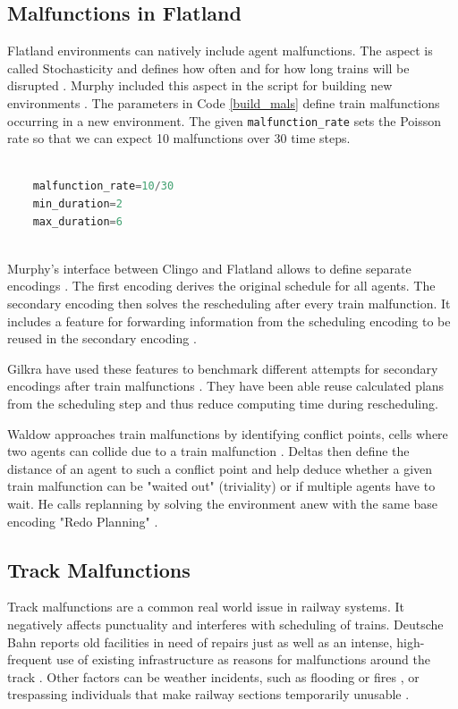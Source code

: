 \documentclass[runningheads]{llncs}
\begin{document}
\subsection{Malfunctions in Flatland}
\label{flatland_mals}
Flatland environments can natively include agent malfunctions. The aspect is called Stochasticity and defines how often and for how long trains will be disrupted \cite{Flatland2023}. Murphy included this aspect in the script for building new environments \cite{Murphy2026a}. The parameters in Code \ref{build_mals} define train malfunctions occurring in a new environment. The given \verb|malfunction_rate| sets the Poisson rate so that we can expect 10 malfunctions over 30 time steps.

\begin{lstlisting}[style=mystyle, language=Python, caption={Generate train malfunctions in build.py.}, label={build_mals}]
	
	malfunction_rate=10/30
	min_duration=2
	max_duration=6
	
\end{lstlisting}

Murphy's interface between Clingo and Flatland allows to define separate encodings \cite{Murphy2026a}. The first encoding derives the original schedule for all agents. The secondary encoding then solves the rescheduling after every train malfunction. It includes a feature for forwarding information from the scheduling encoding to be reused in the secondary encoding \cite{Murphy2026a} \cite{gilkra2025}. 

Gilkra have used these features to benchmark different attempts for secondary encodings after train malfunctions \cite{gilkra2025}. They have been able reuse calculated plans from the scheduling step and thus reduce computing time during rescheduling.

Waldow approaches train malfunctions by identifying conflict points, cells where two agents can collide due to a train malfunction \cite{waldow2025}. Deltas then define the distance of an agent to such a conflict point and help deduce whether a given train malfunction can be "waited out" (triviality) or if multiple agents have to wait. He calls replanning by solving the environment anew with the same base encoding "Redo Planning" \cite[p.~24]{waldow2025}.


\subsection{Track Malfunctions}
\label{trkmals}
Track malfunctions are a common real world issue in railway systems. It negatively affects punctuality and interferes with scheduling of trains. Deutsche Bahn reports old facilities in need of repairs just as well as an intense, high-frequent use of existing infrastructure as reasons for malfunctions around the track \cite{DB2025}. Other factors can be weather incidents, such as flooding \cite{AusPunctuality2025} or fires \cite{DB2025}, or trespassing individuals that make railway sections temporarily unusable \cite{SZdelayarticle2023}.
\end{document}
